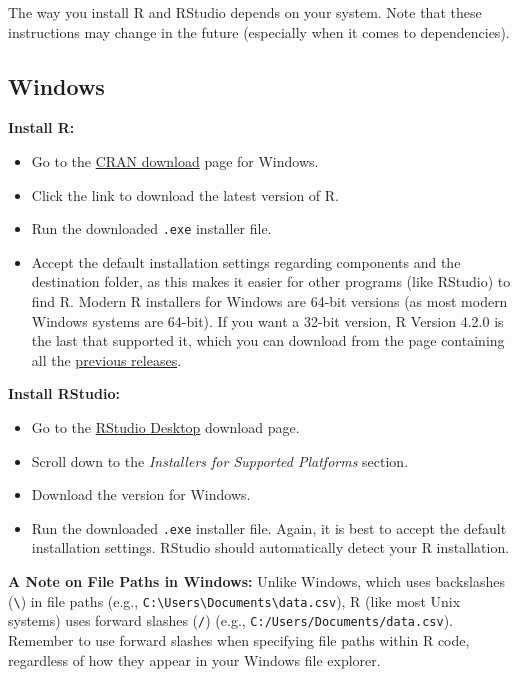 \documentclass[
]{book}
\providecommand{\tightlist}{%
  \setlength{\itemsep}{0pt}\setlength{\parskip}{0pt}}
\begin{document}
The way you install R and RStudio depends on your system. Note that these instructions may change in the future (especially when it comes to dependencies).

\subsection{Windows}\label{windows}

\textbf{Install R:}

\begin{itemize}
\tightlist
\item
  Go to the \href{https://cran.r-project.org/bin/windows/base/}{CRAN download} page for Windows.
\item
  Click the link to download the latest version of R.
\item
  Run the downloaded \texttt{.exe} installer file.
\item
  Accept the default installation settings regarding components and the destination folder, as this makes it easier for other programs (like RStudio) to find R. Modern R installers for Windows are 64-bit versions (as most modern Windows systems are 64-bit). If you want a 32-bit version, R Version 4.2.0 is the last that supported it, which you can download from the page containing all the \href{https://cran.r-project.org/bin/windows/base/old/}{previous releases}.
\end{itemize}

\textbf{Install RStudio:}

\begin{itemize}
\tightlist
\item
  Go to the \href{https://posit.co/download/rstudio-desktop/}{RStudio Desktop} download page.
\item
  Scroll down to the \emph{Installers for Supported Platforms} section.
\item
  Download the version for Windows.
\item
  Run the downloaded \texttt{.exe} installer file. Again, it is best to accept the default installation settings. RStudio should automatically detect your R installation.
\end{itemize}

\textbf{A Note on File Paths in Windows:} Unlike Windows, which uses backslashes (\texttt{\textbackslash{}}) in file paths (e.g., \texttt{C:\textbackslash{}Users\textbackslash{}Documents\textbackslash{}data.csv}), R (like most Unix systems) uses forward slashes (\texttt{/}) (e.g., \texttt{C:/Users/Documents/data.csv}). Remember to use forward slashes when specifying file paths within R code, regardless of how they appear in your Windows file explorer.
\end{document}
